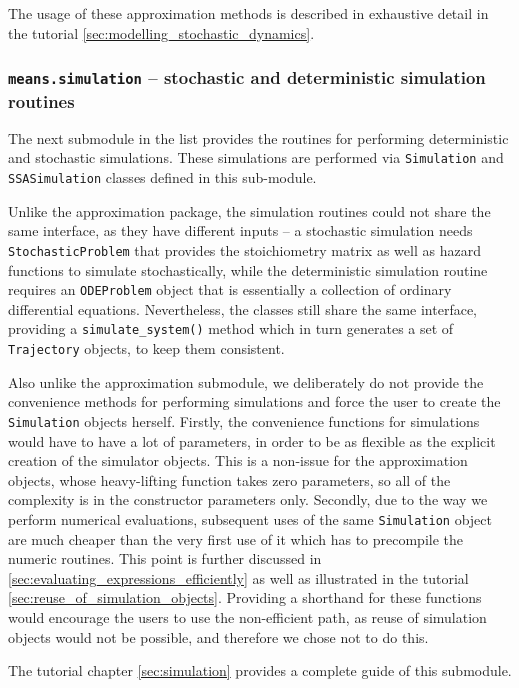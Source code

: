 The usage of these approximation methods is described in exhaustive detail in the tutorial \autoref{sec:modelling_stochastic_dynamics}.

\subsubsection{{\tt means.simulation} -- stochastic and deterministic simulation routines}
\label{sec:package_structure:simulation}

The next submodule in the list provides the routines for performing deterministic and stochastic simulations.
These simulations are performed via \verb"Simulation" and \verb"SSASimulation" classes defined in this sub-module.

Unlike the approximation package, the simulation routines could not share the same interface, as they have different inputs -- a stochastic simulation needs \verb"StochasticProblem" that provides the stoichiometry matrix as well as hazard functions to simulate stochastically, while the deterministic simulation routine requires an \verb"ODEProblem" object that is essentially a collection of ordinary differential equations.
Nevertheless, the classes still share the same interface, providing a \verb"simulate_system()" method which in turn generates a set of \verb"Trajectory" objects, to keep them consistent.

Also unlike the approximation submodule, we deliberately do not provide the convenience methods for performing simulations and force the user to create the \verb"Simulation" objects herself. 
Firstly, the convenience functions for simulations would have to have a lot of parameters, in order to be as flexible as the explicit creation of the simulator objects. 
This is a non-issue for the approximation objects, whose heavy-lifting function takes zero parameters, so all of the complexity is in the constructor parameters only.
Secondly, due to the way we perform numerical evaluations, subsequent uses of the same \verb"Simulation" object are much cheaper than the very first use of it which has to precompile the numeric routines.
This point is further discussed in \autoref{sec:evaluating_expressions_efficiently} as well as illustrated in the tutorial \autoref{sec:reuse_of_simulation_objects}. 
Providing a shorthand for these functions would encourage the users to use the non-efficient path, as reuse of simulation objects would not be possible, and therefore we chose not to do this.

The tutorial chapter \autoref{sec:simulation} provides a complete guide of this submodule.

